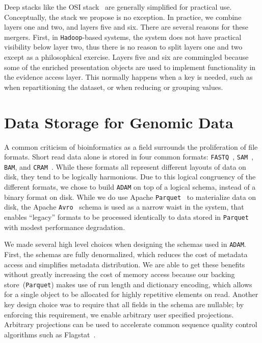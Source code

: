 \documentclass[masters]{ucbthesis}
\begin{document}
Deep stacks like the OSI stack~\cite{zimmermann80} are generally simplified for practical use. Conceptually,
the stack we propose is no exception. In practice, we combine layers one and two, and layers five and six.
There are several reasons for these mergers. First, in \texttt{Hadoop}-based systems, the system does not have practical visibility
below layer two, thus there is no reason to split layers one and two except as a philosophical exercise.
Layers five and six are commingled because some of the enriched presentation objects are used to
implement functionality in the evidence access layer. This normally happens when a key is needed, such as
when repartitioning the dataset, or when reducing or grouping values.

\section{Data Storage for Genomic Data}
\label{sec:schema-design}

A common criticism of bioinformatics as a field surrounds the proliferation of file formats. Short read data alone is
stored in four common formats: \texttt{FASTQ}~\cite{cock10}, \texttt{SAM}~\cite{li09}, \texttt{BAM}, and
\texttt{CRAM}~\cite{fritz11}. While these formats all represent different layouts of data on disk, they tend to be
logically harmonious. Due to this logical congruency of the different formats, we chose to build \texttt{ADAM}
on top of a logical schema, instead of a binary format on disk. While we do use Apache \texttt{Parquet}~\cite{parquet} to
materialize data on disk, the Apache \texttt{Avro}~\cite{avro} schema is used as a narrow waist in the system,
that enables ``legacy'' formats to be processed identically to data stored in \texttt{Parquet} with modest performance
degradation.

We made several high level choices when designing the schemas used in \texttt{ADAM}. First, the schemas are fully
denormalized, which reduces the cost of metadata access and simplifies metadata distribution. We are able to
get these benefits without greatly increasing the cost of memory access because our backing store~(\texttt{Parquet})
makes use of run length and dictionary encoding, which allows for a single object to be allocated for highly repetitive
elements on read. Another key design choice was to require that all fields in the schema are nullable; by enforcing
this requirement, we enable arbitrary user specified projections. Arbitrary projections can be used to accelerate
common sequence quality control algorithms such as Flagstat~\cite{massie13, nothaft15}.
\end{document}
